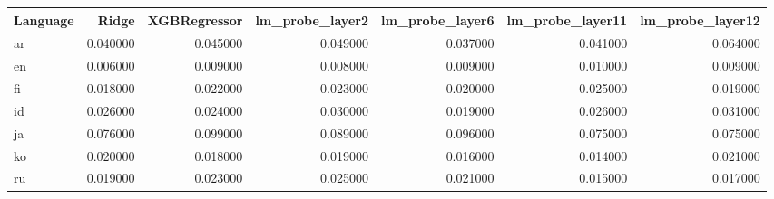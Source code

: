 \begin{tabular}{lrrrrrr}
\toprule
Language & Ridge & XGBRegressor & lm_probe_layer2 & lm_probe_layer6 & lm_probe_layer11 & lm_probe_layer12 \\
\midrule
ar & 0.040000 & 0.045000 & 0.049000 & 0.037000 & 0.041000 & 0.064000 \\
en & 0.006000 & 0.009000 & 0.008000 & 0.009000 & 0.010000 & 0.009000 \\
fi & 0.018000 & 0.022000 & 0.023000 & 0.020000 & 0.025000 & 0.019000 \\
id & 0.026000 & 0.024000 & 0.030000 & 0.019000 & 0.026000 & 0.031000 \\
ja & 0.076000 & 0.099000 & 0.089000 & 0.096000 & 0.075000 & 0.075000 \\
ko & 0.020000 & 0.018000 & 0.019000 & 0.016000 & 0.014000 & 0.021000 \\
ru & 0.019000 & 0.023000 & 0.025000 & 0.021000 & 0.015000 & 0.017000 \\
\bottomrule
\end{tabular}
